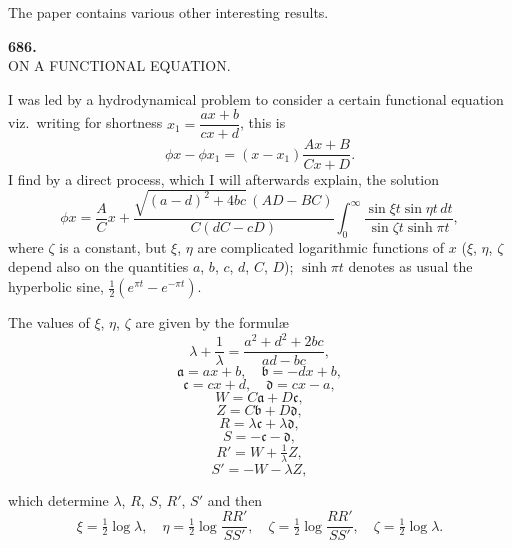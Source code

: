 \documentclass[11pt,a4paper]{article}
\begin{document}
\medskip

The paper contains various other interesting results.

\newpage



\begin{center}
\textbf{686.}\\[6pt]
\large ON A FUNCTIONAL EQUATION.
\end{center}

\medskip


\medskip

I was led by a hydrodynamical problem to consider a certain functional equation viz.\ writing for shortness $x_{1} = \dfrac{ax + b}{cx + d}$, this is
\[
\phi x - \phi x_{1} = (x - x_{1})\frac{Ax + B}{Cx + D}.
\]
I find by a direct process, which I will afterwards explain, the solution
\[
\phi x = \frac{A}{C}x + \frac{\sqrt{(a - d)^{2} + 4bc}\,(AD - BC)}{C(dC - cD)}\int_{0}^{\infty}\frac{\sin\xi t\sin\eta t\,dt}{\sin\zeta t\sinh\pi t},
\]
where $\zeta$ is a constant, but $\xi$, $\eta$ are complicated logarithmic functions of $x$ ($\xi$, $\eta$, $\zeta$ depend also on the quantities $a$, $b$, $c$, $d$, $C$, $D$); $\sinh\pi t$ denotes as usual the hyperbolic sine, $\tfrac{1}{2}(e^{\pi t} - e^{-\pi t})$.

\medskip

The values of $\xi$, $\eta$, $\zeta$ are given by the formul\ae{}
\[
\lambda + \frac{1}{\lambda} = \frac{a^{2} + d^{2} + 2bc}{ad - bc},
\]
\[
\mathfrak{a} = ax + b,\quad \mathfrak{b} = -dx + b,
\]
\[
\mathfrak{c} = cx + d,\quad \mathfrak{d} = cx - a,
\]
\[
W = C\mathfrak{a} + D\mathfrak{c},
\]
\[
Z = C\mathfrak{b} + D\mathfrak{d},
\]
\[
R = \lambda\mathfrak{c} + \lambda\mathfrak{d},
\]
\[
S = -\mathfrak{c} - \mathfrak{d},
\]
\[
R' = W + \tfrac{1}{\lambda}Z,
\]
\[
S' = -W - \lambda Z,
\]

\newpage


which determine $\lambda$, $R$, $S$, $R'$, $S'$ and then
\[
\xi = \tfrac{1}{2}\log\lambda,\quad \eta = \tfrac{1}{2}\log\frac{RR'}{SS'},\quad \zeta = \tfrac{1}{2}\log\frac{RR'}{SS'},\quad \zeta = \tfrac{1}{2}\log\lambda.
\]
\end{document}
